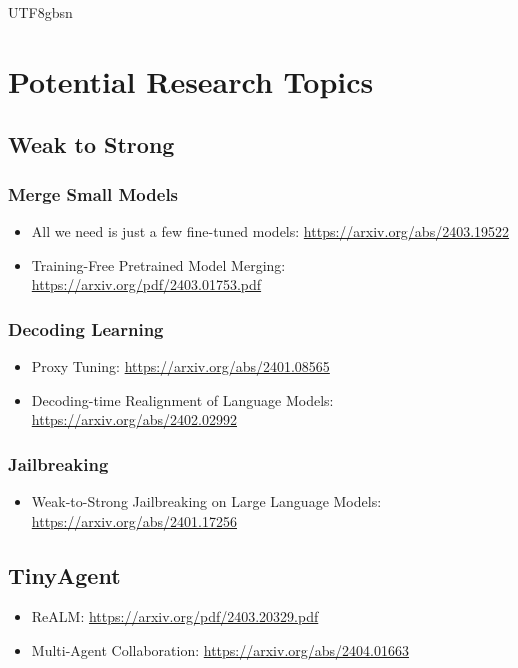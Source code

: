 \documentclass{article}%
\begin{document}
\begin{CJK}{UTF8}{gbsn}
\section{Potential Research Topics}

\subsection{Weak to Strong}

\subsubsection{Merge Small Models}

\begin{itemize}
    \item All we need is just a few fine-tuned models: \url{https://arxiv.org/abs/2403.19522}
    \item Training-Free Pretrained Model Merging: \url{https://arxiv.org/pdf/2403.01753.pdf}
\end{itemize}

\subsubsection{Decoding Learning}

\begin{itemize}
    \item Proxy Tuning: \url{https://arxiv.org/abs/2401.08565}
    \item Decoding-time Realignment of Language Models: \url{https://arxiv.org/abs/2402.02992}
\end{itemize}

\subsubsection{Jailbreaking}

\begin{itemize}
    \item Weak-to-Strong Jailbreaking on Large Language Models: \url{https://arxiv.org/abs/2401.17256}
\end{itemize}


\subsection{TinyAgent}

\begin{itemize}
    \item ReALM: \url{https://arxiv.org/pdf/2403.20329.pdf}
    \item Multi-Agent Collaboration: \url{https://arxiv.org/abs/2404.01663}
\end{itemize}




\end{CJK}
\end{document}
